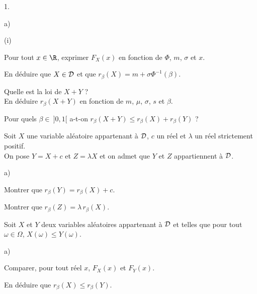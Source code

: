 \documentclass[11pt]{article}%
\begin{document}
\begin{noliste}{1.}
\begin{noliste}{a)}
\begin{nonoliste}{(i)}
      

      
      \item Pour tout $x \in\R$, exprimer $F_X(x)$ en fonction de 
      $\Phi$, $m$, $\sigma$ et $x$.
      
      

      
      \item En déduire que $X \in {\cal D}$ et que 
      $r_\beta(X)=m+\sigma \Phi^{-1}(\beta)$.
      
      
    \end{nonoliste}
    
    \item Quelle est la loi de $X+Y$ ?\\
    En déduire $r_\beta(X+Y)$ en fonction de $m$, $\mu$, $\sigma$, 
    $s$ et $\beta$.
    
    

    
    \item Pour quels $\beta \in \ ]0,1[$ a-t-on $r_{\beta}(X+Y) \leq
    r_\beta(X)+r_\beta(Y)$ ?
    
    
  \end{noliste}
  
  \item Soit $X$ une variable aléatoire appartenant à ${\cal D}$, 
  $c$ un réel et $\lambda$ un réel strictement positif.\\
  On pose $Y=X+c$ et $Z=\lambda X$ et on admet que $Y$ et $Z$ 
  appartiennent à ${\cal D}$.
  \begin{noliste}{a)}
    \setlength{\itemsep}{2mm}
    \item Montrer que $r_\beta(Y)=r_\beta(X)+c$.
    
    

    
    \item Montrer que $r_\beta(Z)=\lambda \, r_\beta(X)$.
    
    
  \end{noliste}
  
  \item Soit $X$ et $Y$ deux variables aléatoires appartenant à
  ${\cal D}$ et telles que pour tout $\omega \in \Omega$, 
  $X(\omega) \leq Y(\omega)$.
  \begin{noliste}{a)}
    \setlength{\itemsep}{2mm}
    \item Comparer, pour tout réel $x$, $F_X(x)$ et $F_Y(x)$.
    
    

    
    \item En déduire que $r_\beta(X) \leq r_\beta(Y)$. 
    
    
  \end{noliste}
\end{noliste}
\end{document}
